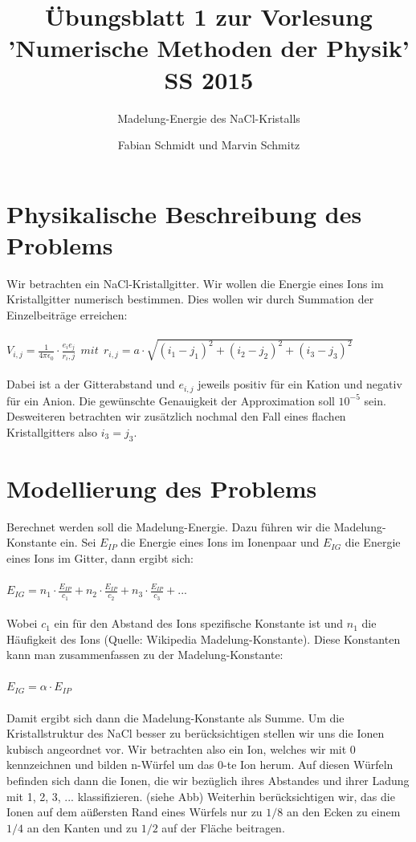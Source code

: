 \documentclass[ngerman]{scrartcl}
\begin{document}
\title{Übungsblatt 1 zur Vorlesung 'Numerische Methoden der Physik' SS 2015}
\subtitle{Madelung-Energie des NaCl-Kristalls}
\author{Fabian Schmidt und Marvin Schmitz}
\maketitle

\newpage

\section*{Physikalische Beschreibung des Problems}

Wir betrachten ein NaCl-Kristallgitter. Wir wollen die Energie eines Ions im Kristallgitter numerisch bestimmen.
Dies wollen wir durch Summation der Einzelbeiträge erreichen: \\ \\
$ V_{i,j} = \frac{1}{4\pi \epsilon_0} \cdot \frac{e_ie_j}{r_i,j}\ \ mit\ \ r_{i,j} = a\cdot \sqrt{(i_1-j_1)^2+(i_2-j_2)^2+(i_3-j_3)^2} $\\ \\
Dabei ist a der Gitterabstand und $e_{i,j}$ jeweils positiv für ein Kation und negativ für ein Anion. Die gewünschte Genauigkeit der Approximation soll $10^{-5}$ sein. Desweiteren betrachten wir zusätzlich nochmal den Fall eines flachen Kristallgitters also $i_3=j_3$.

\section*{Modellierung des Problems}

Berechnet werden soll die Madelung-Energie. Dazu führen wir die Madelung-Konstante ein. Sei $E_{IP}$ die Energie eines Ions im Ionenpaar und $E_{IG}$ die Energie eines Ions im Gitter, dann ergibt sich:\\ \\
$ E_{IG} = n_1 \cdot \frac{E_{IP}}{c_1} + n_2\cdot \frac{E_{IP}}{c_2} + n_3\cdot \frac{E_{IP}}{c_3} + ... $ \\ \\
Wobei $c_1$ ein für den Abstand des Ions spezifische Konstante ist und $n_1$ die Häufigkeit des Ions (Quelle: Wikipedia Madelung-Konstante). Diese Konstanten kann man zusammenfassen zu der Madelung-Konstante:\\ \\
$ E_{IG} = \alpha \cdot E_{IP} $\\ \\
Damit ergibt sich dann die Madelung-Konstante als Summe. Um die Kristallstruktur des NaCl besser zu berücksichtigen stellen wir uns die Ionen kubisch angeordnet vor. Wir betrachten also ein Ion, welches wir mit 0 kennzeichnen und bilden n-Würfel um das 0-te Ion herum. Auf diesen Würfeln befinden sich dann die Ionen, die wir bezüglich ihres Abstandes und ihrer Ladung mit 1, 2, 3, ... klassifizieren. (siehe Abb) Weiterhin berücksichtigen wir, das die Ionen auf dem aüßersten Rand eines Würfels nur zu $ 1/8 $ an den Ecken zu einem $ 1/4 $ an den Kanten und zu $ 1/2 $ auf der Fläche beitragen.
\end{document}
